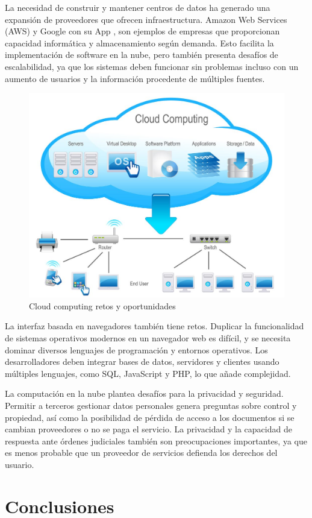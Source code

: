 \documentclass[a4paper,10pt]{article}
\begin{document}
La necesidad de construir y mantener centros de datos ha generado una expansión de proveedores que ofrecen infraestructura. Amazon Web Services (AWS) y Google con su App   , son ejemplos de empresas que proporcionan capacidad informática y almacenamiento según demanda. Esto facilita la implementación de software en la nube, pero también presenta desafíos de escalabilidad, ya que los sistemas deben funcionar sin problemas incluso con un aumento de usuarios y la información procedente de múltiples fuentes.

\begin{figure}[h!]
    \centering
    \includegraphics[width=0.5\linewidth]{Cloud-computing-challenges-and-opportunities.jpg}
        \caption{Cloud computing retos y oportunidades}
    \label{fig:ejemplo}
\end{figure}


La interfaz basada en navegadores también tiene retos. Duplicar la funcionalidad de sistemas operativos modernos en un navegador web es difícil, y se necesita dominar diversos lenguajes de programación y entornos operativos. Los desarrolladores deben integrar bases de datos, servidores y clientes usando múltiples lenguajes, como SQL, JavaScript y PHP, lo que añade complejidad.

La computación en la nube plantea desafíos para la privacidad y seguridad. Permitir a terceros gestionar datos personales genera preguntas sobre control y propiedad, así como la posibilidad de pérdida de acceso a los documentos si se cambian proveedores o no se paga el servicio. La privacidad y la capacidad de respuesta ante órdenes judiciales también son preocupaciones importantes, ya que es menos probable que un proveedor de servicios defienda los derechos del usuario.




\section{Conclusiones}
\end{document}
